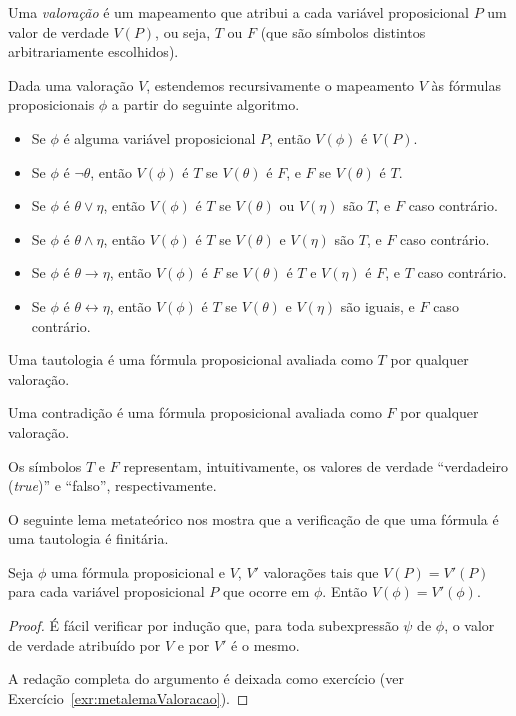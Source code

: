 \begin{metadefinition}[Valoração]\label{mdef:valoracao}
    Uma \emph{valoração} é um mapeamento que atribui a cada variável proposicional $P$ um valor de verdade $V(P)$, ou seja, $T$ ou $F$ (que são símbolos distintos arbitrariamente escolhidos).

    Dada uma valoração $V$, estendemos recursivamente o mapeamento $V$ às fórmulas proposicionais $\phi$ a partir do seguinte algoritmo.
    \begin{itemize}
        \item Se $\phi$ é alguma variável proposicional $P$, então $ V(\phi)$ é $V(P)$.
        \item Se $\phi$ é $\neg \theta$, então $ V(\phi)$ é $T$ se $ V(\theta)$ é $F$, e $F$ se $ V(\theta)$ é $T$.
        \item Se $\phi$ é $\theta \vee \eta$, então $ V(\phi)$ é $T$ se $ V(\theta)$ ou $ V(\eta)$ são $T$, e $F$ caso contrário.
        \item Se $\phi$ é $\theta \wedge \eta$, então $ V(\phi)$ é $T$ se $ V(\theta)$ e $ V(\eta)$ são $T$, e $F$ caso contrário.
        \item Se $\phi$ é $\theta \rightarrow \eta$, então $ V(\phi)$ é $F$ se $ V(\theta)$ é $T$ e $ V(\eta)$ é $F$, e $T$ caso contrário.
        \item Se $\phi$ é $\theta \leftrightarrow \eta$, então $ V(\phi)$ é $T$ se $ V(\theta)$ e $ V(\eta)$ são iguais, e $F$ caso contrário.
    \end{itemize}

    Uma tautologia é uma fórmula proposicional avaliada como $T$ por qualquer valoração.

    Uma contradição é uma fórmula proposicional avaliada como $F$ por qualquer valoração.
\end{metadefinition}
Os símbolos $T$ e $F$ representam, intuitivamente, os valores de verdade ``verdadeiro (\emph{true})'' e ``falso'', respectivamente.

O seguinte lema metateórico nos mostra que a verificação de que uma fórmula é uma tautologia é finitária.

\begin{metalemma}\label{mlem:valoracao}
    Seja $\phi$ uma fórmula proposicional e $V$, $V'$ valorações tais que $V(P) = V'(P)$ para cada variável proposicional $P$ que ocorre em $\phi$.
    Então $ V(\phi) =  V'(\phi)$.
\end{metalemma}
\begin{proof}
    É fácil verificar por indução que, para toda subexpressão $\psi$ de $\phi$, o valor de verdade atribuído por $V$ e por $V'$ é o mesmo.

    A redação completa do argumento é deixada como exercício (ver Exercício~\ref{exr:metalemaValoracao}).
\end{proof}

